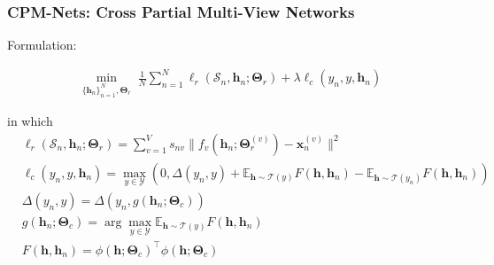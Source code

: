 \documentclass[notheorems, aspectratio=54]{beamer}
\begin{document}
\begin{frame} \frametitle{CPM-Nets: Cross Partial Multi-View Networks}

Formulation:

\begin{equation}
\begin{split}
  \min_{\{\mathbf{h}_n\}_{n=1}^N, \boldsymbol{\Theta}_r}\; \frac{1}{N}\sum_{n=1}^N \ell_r(\mathcal{S}_n, \mathbf{h}_n; \boldsymbol{\Theta}_r) + \lambda \ell_c(y_n, y, \mathbf{h}_n)
\end{split}
\end{equation}

in which 
\begin{equation}
\begin{split}
  & \ell_r(\mathcal{S}_n, \mathbf{h}_n; \boldsymbol{\Theta}_r) = \sum_{v=1}^V s_{nv}\|f_v(\mathbf{h}_n; \boldsymbol{\Theta}_r^{(v)}) - \mathbf{x}_n^{(v)}\|^2 \\
  & \ell_c(y_n, y, \mathbf{h}_n) = \max_{y\in \mathcal{Y}} \left( 0, \Delta (y_n, y) + \mathbb{E}_{\mathbf{h}\sim\mathcal{T}(y)} F(\mathbf{h}, \mathbf{h}_n) - \mathbb{E}_{\mathbf{h}\sim\mathcal{T}(y_n)} F(\mathbf{h}, \mathbf{h}_n) \right) \\
  & \Delta (y_n, y) = \Delta (y_n, g(\mathbf{h}_n;\boldsymbol{\Theta}_c)) \\
  & g(\mathbf{h}_n;\boldsymbol{\Theta}_c) = \arg\max_{y\in\mathcal{Y}} \mathbb{E}_{\mathbf{h}\sim\mathcal{T}(y)} F(\mathbf{h}, \mathbf{h}_n) \\
  & F(\mathbf{h}, \mathbf{h}_n) = \phi (\mathbf{h}; \boldsymbol{\Theta}_c)^\top\phi (\mathbf{h}; \boldsymbol{\Theta}_c)
\end{split}
\end{equation}

\end{frame}
\end{document}
